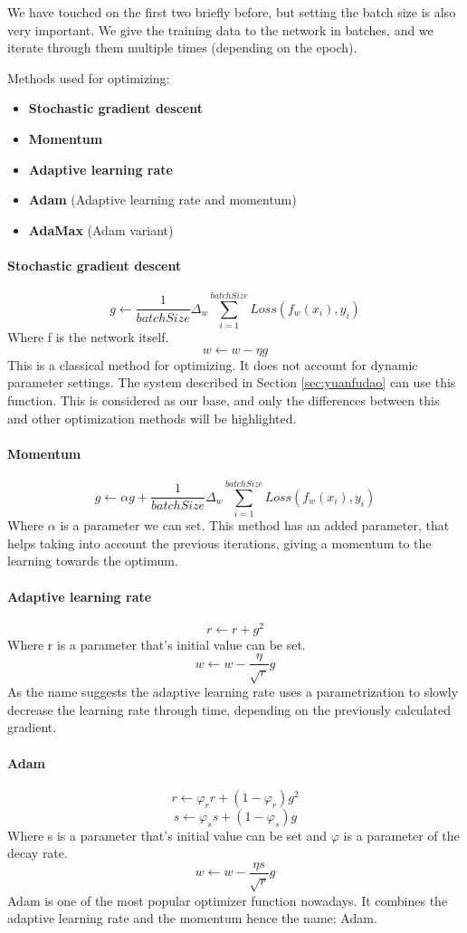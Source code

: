 We have touched on the first two briefly before, but setting the batch size is also very important. We give the training data to the network in batches, and we iterate through them multiple times (depending on the epoch).

Methods used for optimizing:
\begin{itemize}
	\item \textbf{Stochastic gradient descent}
	\item \textbf{Momentum}
	\item \textbf{Adaptive learning rate}
	\item \textbf{Adam} (Adaptive learning rate and momentum)
	\item \textbf{AdaMax} (Adam variant)
\end{itemize}

\paragraph*{Stochastic gradient descent}
\[g \leftarrow \frac{1}{batchSize}\Delta_w \sum_{i=1}^{batchSize}Loss(f_w(x_i), y_i)\]
Where f is the network itself.
\[w \leftarrow w - \eta g\]
This is a classical method for optimizing. It does not account for dynamic parameter settings. The system described in Section \ref{sec:yuanfudao} can use this function.
This is considered as our base, and only the differences between this and other optimization methods will be highlighted.

\paragraph*{Momentum}
\[g \leftarrow \alpha g + \frac{1}{batchSize}\Delta_w \sum_{i=1}^{batchSize}Loss(f_w(x_i), y_i)\]
Where \(\alpha\) is a parameter we can set.
This method has an added parameter, that helps taking into account the previous iterations, giving a momentum to the learning towards the optimum.

\paragraph*{Adaptive learning rate}
\[r \leftarrow r + g^2\]
Where r is a parameter that's initial value can be set.
\[w \leftarrow w - \frac{\eta}{\sqrt{r}} g\]
As the name suggests the adaptive learning rate uses a parametrization to slowly decrease the learning rate through time, depending on the previously calculated gradient.

\paragraph*{Adam}
\[r \leftarrow \varphi_r r + (1 - \varphi_r) g^2\]
\[s \leftarrow \varphi_s s + (1 - \varphi_s) g\]
Where s is a parameter that's initial value can be set and \(\varphi\) is a parameter of the decay rate.
\[w \leftarrow w - \frac{\eta s}{\sqrt{r}} g\]
Adam is one of the most popular optimizer function nowadays. It combines the adaptive learning rate and the momentum hence the name: Adam.

